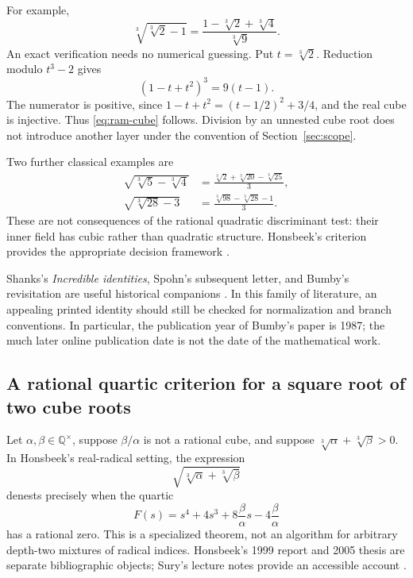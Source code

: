 \documentclass[11pt,a4paper]{article}
\numberwithin{equation}{section}
\theoremstyle{definition}\newtheorem{definition}[theorem]{Definition}
\theoremstyle{remark}\newtheorem{remark}[theorem]{Remark}
\newcommand{\Q}{\mathbb Q}\newcommand{\R}{\mathbb R}\newcommand{\C}{\mathbb C}\newcommand{\Z}{\mathbb Z}
\begin{document}
For example,
\begin{equation}\label{eq:ram-cube}
\sqrt[3]{\sqrt[3]2-1}
=\frac{1-\sqrt[3]2+\sqrt[3]4}{\sqrt[3]9}.
\end{equation}
An exact verification needs no numerical guessing. Put $t=\sqrt[3]2$. Reduction modulo $t^3-2$ gives
\[
(1-t+t^2)^3=9(t-1).
\]
The numerator is positive, since $1-t+t^2=(t-1/2)^2+3/4$, and the real cube is injective. Thus \eqref{eq:ram-cube} follows. Division by an unnested cube root does not introduce another layer under the convention of Section~\ref{sec:scope}.

Two further classical examples are
\begin{align}
\sqrt{\sqrt[3]5-\sqrt[3]4}
 &=\frac{\sqrt[3]2+\sqrt[3]{20}-\sqrt[3]{25}}3,
 \label{eq:ram-five}\\
\sqrt{\sqrt[3]{28}-3}
 &=\frac{\sqrt[3]{98}-\sqrt[3]{28}-1}3.
 \label{eq:ram-twentyeight}
\end{align}
These are not consequences of the rational quadratic discriminant test: their inner field has cubic rather than quadratic structure. Honsbeek's criterion provides the appropriate decision framework \cite{honsbeek99,honsbeek05,sury}.

Shanks's \emph{Incredible identities}, Spohn's subsequent letter, and Bumby's revisitation are useful historical companions \cite{shanks,spohn,bumby}. In this family of literature, an appealing printed identity should still be checked for normalization and branch conventions. In particular, the publication year of Bumby's paper is 1987; the much later online publication date is not the date of the mathematical work.

\subsection{A rational quartic criterion for a square root of two cube roots}
Let $\alpha,\beta\in\Q^\times$, suppose $\beta/\alpha$ is not a rational cube, and suppose $\sqrt[3]\alpha+\sqrt[3]\beta>0$. In Honsbeek's real-radical setting, the expression
\[
\sqrt{\sqrt[3]\alpha+\sqrt[3]\beta}
\]
denests precisely when the quartic
\begin{equation}\label{eq:honsbeek}
F(s)=s^4+4s^3+8\frac{\beta}{\alpha}s-4\frac{\beta}{\alpha}
\end{equation}
has a rational zero. This is a specialized theorem, not an algorithm for arbitrary depth-two mixtures of radical indices. Honsbeek's 1999 report and 2005 thesis are separate bibliographic objects; Sury's lecture notes provide an accessible account \cite{honsbeek99,honsbeek05,sury}.
\end{document}
